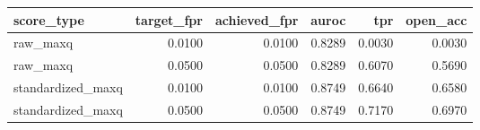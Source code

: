 \begin{tabular}{lrrrrr}
\toprule
score_type & target_fpr & achieved_fpr & auroc & tpr & open_acc \\
\midrule
raw_maxq & 0.0100 & 0.0100 & 0.8289 & 0.0030 & 0.0030 \\
raw_maxq & 0.0500 & 0.0500 & 0.8289 & 0.6070 & 0.5690 \\
standardized_maxq & 0.0100 & 0.0100 & 0.8749 & 0.6640 & 0.6580 \\
standardized_maxq & 0.0500 & 0.0500 & 0.8749 & 0.7170 & 0.6970 \\
\bottomrule
\end{tabular}
